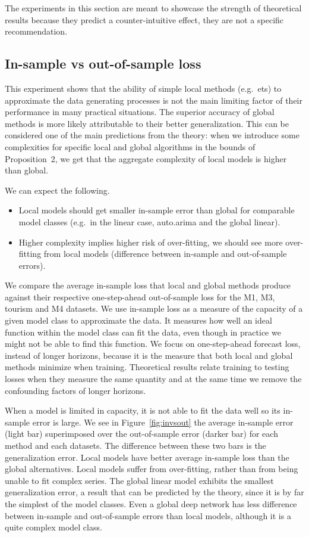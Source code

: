 \documentclass[a4paper]{article}
\theoremstyle{custom}
\begin{document}
The experiments in this section are meant to showcase the strength of theoretical results because they predict a counter-intuitive effect, they are not a specific recommendation.

\subsection{In-sample vs out-of-sample loss}
\label{sec:insample}
This experiment shows that the ability of simple local methods (e.g.\ ets) to approximate the data generating processes is not the main limiting factor of their performance in many practical situations.
The superior accuracy of global methods is more likely attributable to their better generalization.
This can be considered one of the main predictions from the theory: when we introduce some complexities for specific local and global algorithms in the bounds of Proposition~2, we get that the aggregate complexity of local models is higher than global.

We can expect the following.
\begin{itemize}
\item Local models should get smaller in-sample error than global for comparable model classes (e.g.\ in the linear case, auto.arima and the global linear).
\item Higher complexity implies higher risk of over-fitting, we should see more over-fitting from local models (difference between in-sample and out-of-sample errors).
\end{itemize}

We compare the average in-sample loss that local and global methods produce against their respective one-step-ahead out-of-sample loss for the M1, M3, tourism and M4 datasets.
We use in-sample loss as a measure of the capacity of a given model class to approximate the data.
It measures how well an ideal function within the model class can fit the data, even though in practice we might not be able to find this function.
We focus on one-step-ahead forecast loss, instead of longer horizons, because it is the measure that both local and global methods minimize when training. Theoretical results relate training to testing losses when they measure the same quantity and at the same time we remove the confounding factors of longer horizons.

When a model is limited in capacity, it is not able to fit the data well so its in-sample error is large.
We see in Figure~\ref{fig:invsout} the average in-sample error (light bar) superimposed over the out-of-sample error (darker bar) for each method and each datasets. The difference between these two bars is the generalization error. Local models have better average in-sample loss than the global alternatives. Local models suffer from over-fitting, rather than from being unable to fit complex series.
The global linear model exhibits the smallest generalization error, a result that can be predicted by the theory, since it is by far the simplest of the model classes.
Even a global deep network has less difference between in-sample and out-of-sample errors than local models, although it is a quite complex model class.
\end{document}
